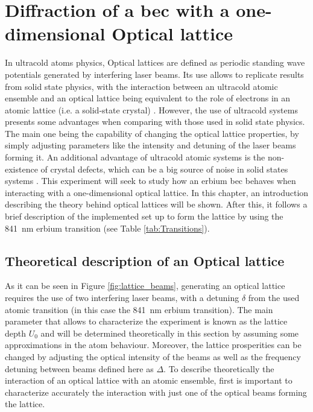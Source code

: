 
\chapter{Diffraction of a \acl{bec} with a one-dimensional Optical lattice}
\label{chap:one_dimensional_lattices}
In ultracold atoms physics, Optical lattices are defined as periodic standing wave potentials generated by interfering laser beams. Its use allows to replicate results from solid state physics, with the interaction between an ultracold atomic ensemble and an optical lattice being equivalent to the role of electrons in an atomic lattice (i.e. a solid-state crystal) \cite{Lewenstein2007, Bloch2008,Morsch2006}.  However, the use of ultracold systems presents some advantages when comparing with those used in solid state physics. The main one being the capability of changing the optical lattice properties, by simply adjusting parameters like the intensity and detuning of the laser beams forming it. An additional advantage of ultracold atomic systems is the non-existence of crystal defects, which can be a big source of noise in solid states systems \cite{VanDerZiel1978}. This experiment will seek to study how an erbium \ac{bec} behaves when interacting with a one-dimensional optical lattice. In this chapter, an introduction describing the theory behind optical lattices will be shown. After this, it follows a brief description of the implemented set up to form the lattice by using the \SI{841}{\nano\meter} erbium transition (see Table \ref{tab:Transitions}).


\section{Theoretical description of an Optical lattice}

As it can be seen in Figure \ref{fig:lattice_beams}, generating an optical lattice requires the use of two interfering laser beams, with a detuning $\delta$ from the used atomic transition (in this case the \SI{841}{\nano\meter} erbium transition). The main parameter that allows to characterize the experiment is known as the lattice depth $U_0$ and will be determined theoretically in this section by assuming some approximations in the atom behaviour. Moreover, the lattice prosperities can be changed by adjusting the optical intensity of the beams as well as the frequency detuning between beams defined here as $\Delta$. To describe theoretically the interaction of an optical lattice with an atomic ensemble, first is important to characterize accurately the interaction with just one of the optical beams forming the lattice.

